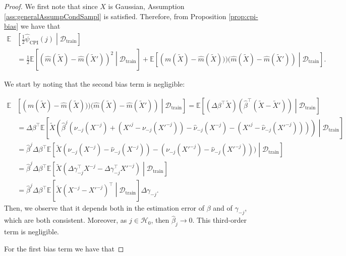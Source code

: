 \documentclass{article}
\theoremstyle{plain}
\theoremstyle{definition}
\theoremstyle{remark}
\newcommand{\e}[1]{\mathbb{E}\left[#1\right]  } %
\begin{document}
\begin{proof}
We first note that since $X$ is Gaussian, Assumption \ref{ass:generalAssumpCondSampl} is satisfied. Therefore, from Proposition \ref{prop:cpi-bias} we have that
\begin{align*}
     \mathbb{E}&\left[\frac{1}{2}\widehat{\psi}_\mathrm{CPI}(j)\middle|\mathcal{D}_\mathrm{train}\right]\\&=\frac{1}{2}\e{\left(\widehat{m}(\widetilde{X})-\widehat{m}(\widetilde{X}')\right)^2\middle|\mathcal{D}_\mathrm{train}}+ \e{\left(m(\widetilde{X})-\widehat{m}(\widetilde{X})))(\widehat{m}(\widetilde{X})-\widehat{m}(\widetilde{X}')\right)\middle|\mathcal{D}_\mathrm{train}}.
 \end{align*}
 
We start by noting that the second bias term is negligible:

\begin{align*}
    \mathbb{E}&\left[\left(m(\widetilde{X})-\widehat{m}(\widetilde{X})))(\widehat{m}(\widetilde{X})-\widehat{m}(\widetilde{X}')\right)\middle|\mathcal{D}_\mathrm{train}\right] = \e{(\Delta\beta^\top\widetilde{X})(\widehat{\beta}^\top(\widetilde{X}-\widetilde{X}'))\middle|\mathcal{D}_\mathrm{train}}\\
    &= \Delta\beta^\top\e{\widetilde{X}(\widehat{\beta}^j(\nu_{-j}(X^{-j})+(X'^j-\nu_{-j}(X'^{-j}))-\widehat{\nu}_{-j}(X^{-j})-(X'^j-\widehat{\nu}_{-j}(X'^{-j}))))\middle|\mathcal{D}_\mathrm{train}}
    \\
    &= \widehat{\beta}^j\Delta\beta^\top\e{\widetilde{X}(\nu_{-j}(X^{-j})-\widehat{\nu}_{-j}(X^{-j}))-(\nu_{-j}(X'^{-j})-\widehat{\nu}_{-j}(X'^{-j})))\middle|\mathcal{D}_\mathrm{train}}
    \\
    &= \widehat{\beta}^j\Delta\beta^\top\e{\widetilde{X}(\Delta\gamma_{-j}^\top X^{-j}-\Delta\gamma_{-j}^\top X'^{-j})\middle|\mathcal{D}_\mathrm{train}}
    \\
    &= \widehat{\beta}^j\Delta\beta^\top\e{\widetilde{X}(X^{-j}- X'^{-j})^\top\middle|\mathcal{D}_\mathrm{train}}\Delta\gamma_{-j}.
\end{align*}
Then, we observe that it depends both in the estimation error of $\beta$ and of $\gamma_{-j}$, which are both consistent. Moreover, as $j\in\mathcal{H}_0$, then $\widehat{\beta}_j\to0$. This third-order term is negligible.


For the first bias term we have that


\end{proof}
\end{document}
